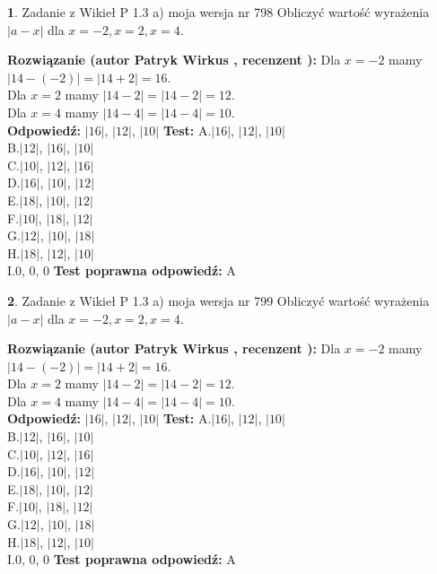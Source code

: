 \documentclass[12pt, a4paper]{article}
\theoremstyle{definition} %
\newtheorem{zad}{}
\newcommand{\zadStart}[1]{\begin{zad}#1\newline}
\newcommand{\zadStop}{\end{zad}}
\newcommand{\rozwStart}[2]{\noindent \textbf{Rozwiązanie (autor #1 , recenzent #2): }\newline}
\newcommand{\rozwStop}{\newline}
\newcommand{\odpStart}{\noindent \textbf{Odpowiedź:}\newline}
\newcommand{\odpStop}{\newline}
\newcommand{\testStart}{\noindent \textbf{Test:}\newline}
\newcommand{\testStop}{\newline}
\newcommand{\kluczStart}{\noindent \textbf{Test poprawna odpowiedź:}\newline}
\newcommand{\kluczStop}{\newline}
\begin{document}
\zadStart{Zadanie z Wikieł P 1.3 a) moja wersja nr 798}
Obliczyć wartość wyrażenia $|a - x|$ dla $x=-2,x=2,x=4$.
\zadStop
\rozwStart{Patryk Wirkus}{}
Dla $x = -2$ mamy $|14 - (-2)| = |14 + 2| = 16$.\\
Dla $x = 2$ mamy $|14 - 2| = |14 - 2| = 12$.\\
Dla $x = 4$ mamy $|14 - 4| = |14 - 4| = 10$.\\
\rozwStop
\odpStart
$|16|$, $|12|$, $|10|$
\odpStop
\testStart
A.$|16|$, $|12|$, $|10|$\\
B.$|12|$, $|16|$, $|10|$\\
C.$|10|$, $|12|$, $|16|$\\
D.$|16|$, $|10|$, $|12|$\\
E.$|18|$, $|10|$, $|12|$\\
F.$|10|$, $|18|$, $|12|$\\
G.$|12|$, $|10|$, $|18|$\\
H.$|18|$, $|12|$, $|10|$\\
I.$0$, $0$, $0$
\testStop
\kluczStart
A
\kluczStop



\zadStart{Zadanie z Wikieł P 1.3 a) moja wersja nr 799}
Obliczyć wartość wyrażenia $|a - x|$ dla $x=-2,x=2,x=4$.
\zadStop
\rozwStart{Patryk Wirkus}{}
Dla $x = -2$ mamy $|14 - (-2)| = |14 + 2| = 16$.\\
Dla $x = 2$ mamy $|14 - 2| = |14 - 2| = 12$.\\
Dla $x = 4$ mamy $|14 - 4| = |14 - 4| = 10$.\\
\rozwStop
\odpStart
$|16|$, $|12|$, $|10|$
\odpStop
\testStart
A.$|16|$, $|12|$, $|10|$\\
B.$|12|$, $|16|$, $|10|$\\
C.$|10|$, $|12|$, $|16|$\\
D.$|16|$, $|10|$, $|12|$\\
E.$|18|$, $|10|$, $|12|$\\
F.$|10|$, $|18|$, $|12|$\\
G.$|12|$, $|10|$, $|18|$\\
H.$|18|$, $|12|$, $|10|$\\
I.$0$, $0$, $0$
\testStop
\kluczStart
A
\kluczStop
\end{document}
